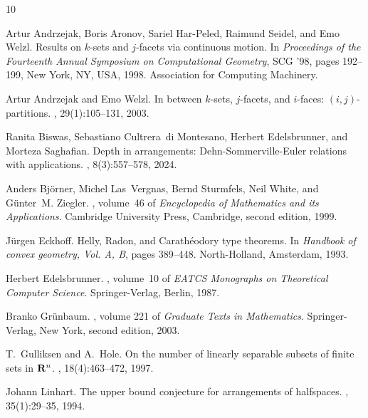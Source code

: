 \documentclass[11pt]{article}
\begin{document}
\begin{thebibliography}{10}

Artur Andrzejak, Boris Aronov, Sariel Har-Peled, Raimund Seidel, and Emo Welzl.
\newblock Results on $k$-sets and $j$-facets via continuous motion.
\newblock In {\em Proceedings of the Fourteenth Annual Symposium on
  Computational Geometry}, SCG '98, pages 192--199, New York, NY, USA, 1998.
  Association for Computing Machinery.

Artur Andrzejak and Emo Welzl.
\newblock In between {$k$}-sets, {$j$}-facets, and {$i$}-faces:
  {$(i,j)$}-partitions.
, 29(1):105--131, 2003.

Ranita Biswas, Sebastiano Cultrera~di Montesano, Herbert Edelsbrunner, and
  Morteza Saghafian.
\newblock Depth in arrangements: {D}ehn-{S}ommerville-{E}uler relations with
  applications.
, 8(3):557--578, 2024.

Anders Bj\"{o}rner, Michel Las~Vergnas, Bernd Sturmfels, Neil White, and
  G\"{u}nter~M. Ziegler.
, volume~46 of {\em Encyclopedia of
  Mathematics and its Applications}.
\newblock Cambridge University Press, Cambridge, second edition, 1999.

J\"{u}rgen Eckhoff.
\newblock Helly, {R}adon, and {C}arath\'{e}odory type theorems.
\newblock In {\em Handbook of convex geometry, {V}ol. {A}, {B}}, pages
  389--448. North-Holland, Amsterdam, 1993.

Herbert Edelsbrunner.
, volume~10 of {\em EATCS
  Monographs on Theoretical Computer Science}.
\newblock Springer-Verlag, Berlin, 1987.

Branko Gr\"unbaum.
, volume 221 of {\em Graduate Texts in
  Mathematics}.
\newblock Springer-Verlag, New York, second edition, 2003.

T.~Gulliksen and A.~Hole.
\newblock On the number of linearly separable subsets of finite sets in {$\bold
  R^n$}.
, 18(4):463--472, 1997.

Johann Linhart.
\newblock The upper bound conjecture for arrangements of halfspaces.
, 35(1):29--35, 1994.


\end{thebibliography}
\end{document}
